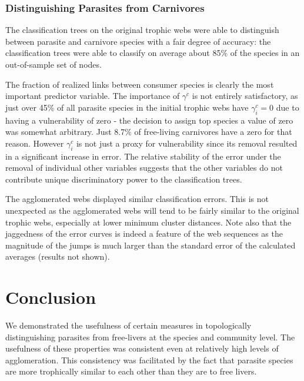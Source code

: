 \documentclass[../dissertation.tex]{subfiles}
\begin{document}
\subsubsection{Distinguishing Parasites from Carnivores} The classification
trees on the original trophic webs were able to distinguish between parasite
and carnivore species with a fair degree of accuracy: 
the classification trees were able to classify on average about 85\% of the species
in an out-of-sample set of nodes. 

The fraction of realized links between consumer species is clearly the most
important predictor variable. The importance of $\gamma^{c}$ is not entirely
satisfactory, as just over 45\% of all parasite species in the initial trophic
webs have $\gamma^{c}_i=0$ due to having a vulnerability of zero - the
decision to assign top species a value of zero was somewhat arbitrary. Just
8.7\% of free-living carnivores have a zero for that reason. However
$\gamma^{c}_i$ is not just a proxy for vulnerability since its removal
resulted in a significant increase in error. The relative stability of the
error under the removal of individual other variables suggests that the other
variables do not contribute unique discriminatory power to the classification
trees.

The agglomerated webs displayed similar classification errors.  This is not
unexpected as the agglomerated webs will tend to be fairly similar to the
original trophic webs, especially at lower minimum cluster distances.  Note
also that the jaggedness of the error curves is indeed a feature of the web
sequences as the magnitude of the jumps is much larger than the standard error
of the calculated averages (results not shown).

\section{Conclusion} We demonstrated the usefulness of certain measures in
topologically distinguishing parasites from free-livers at the species and
community level. The usefulness of these properties was consistent even at
relatively high levels of agglomeration. This consistency was facilitated by
the fact that parasite species are more trophically similar to each other than
they are to free livers.




 
\end{document}
